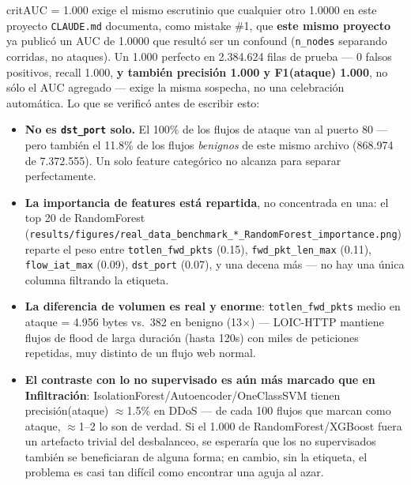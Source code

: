 \documentclass[11pt]{article}
\newcommand{\code}[1]{\texttt{\small #1}}
\begin{document}
\begin{cbox}{crit}{AUC = 1.000 exige el mismo escrutinio que cualquier otro 1.0000 en este proyecto}
\code{CLAUDE.md} documenta, como mistake \#1, que \textbf{este mismo proyecto} ya publicó
un AUC de 1.0000 que resultó ser un confound (\code{n\_nodes} separando corridas, no
ataques). Un 1.000 perfecto en 2.384.624 filas de prueba --- 0 falsos positivos, recall
1.000, \textbf{y también precisión 1.000 y F1(ataque) 1.000}, no sólo el AUC agregado ---
exige la misma sospecha, no una celebración automática. Lo que se verificó antes de
escribir esto:

\begin{itemize}[leftmargin=1.4em,itemsep=1pt]
\item \textbf{No es \code{dst\_port} solo.} El 100\% de los flujos de ataque van al
  puerto 80 --- pero también el 11.8\% de los flujos \emph{benignos} de este mismo
  archivo (868.974 de 7.372.555). Un solo feature categórico no alcanza para separar
  perfectamente.
\item \textbf{La importancia de features está repartida}, no concentrada en una: el top
  20 de RandomForest (\code{results/figures/real\_data\_benchmark\_*\_RandomForest\_importance.png})
  reparte el peso entre \code{totlen\_fwd\_pkts} (0.15), \code{fwd\_pkt\_len\_max} (0.11),
  \code{flow\_iat\_max} (0.09), \code{dst\_port} (0.07), y una decena más --- no hay una
  única columna filtrando la etiqueta.
\item \textbf{La diferencia de volumen es real y enorme}: \code{totlen\_fwd\_pkts} medio
  en ataque = 4.956 bytes vs.\ 382 en benigno (13$\times$) --- LOIC-HTTP mantiene flujos
  de flood de larga duración (hasta 120s) con miles de peticiones repetidas, muy distinto
  de un flujo web normal.
\item \textbf{El contraste con lo no supervisado es aún más marcado que en Infiltración}:
  IsolationForest/Autoencoder/OneClassSVM tienen precisión(ataque) $\approx$1.5\% en
  DDoS --- de cada 100 flujos que marcan como ataque, $\approx$1--2 lo son de verdad. Si
  el 1.000 de RandomForest/XGBoost fuera un artefacto trivial del desbalanceo, se
  esperaría que los no supervisados también se beneficiaran de alguna forma; en cambio,
  sin la etiqueta, el problema es casi tan difícil como encontrar una aguja al azar.
\end{itemize}


\end{cbox}
\end{document}
